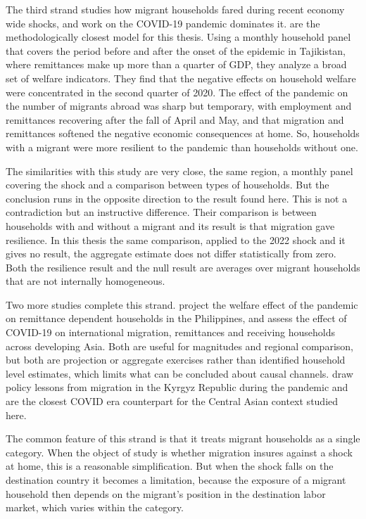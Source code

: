 The third strand studies how migrant households fared during recent economy wide shocks, and work on the COVID-19 pandemic dominates it. \cite{shimizutani2021} are the methodologically closest model for this thesis. Using a monthly household panel that covers the period before and after the onset of the epidemic in Tajikistan, where remittances make up more than a quarter of GDP, they analyze a broad set of welfare indicators. They find that the negative effects on household welfare were concentrated in the second quarter of 2020. The effect of the pandemic on the number of migrants abroad was sharp but temporary, with employment and remittances recovering after the fall of April and May, and that migration and remittances softened the negative economic consequences at home. So, households with a migrant were more resilient to the pandemic than households without one.

The similarities with this study are very close, the same region, a monthly panel covering the shock and a comparison between types of households. But the conclusion runs in the opposite direction to the result found here. This is not a contradiction but an instructive difference. Their comparison is between households with and without a migrant and its result is that migration gave resilience. In this thesis the same comparison, applied to the 2022 shock and it gives no result, the aggregate estimate does not differ statistically from zero. Both the resilience result and the null result are averages over migrant households that are not internally homogeneous.

Two more studies complete this strand. \cite{murakami2021} project the welfare effect of the pandemic on remittance dependent households in the Philippines, and \cite{kikkawa2020} assess the effect of COVID-19 on international migration, remittances and receiving households across developing Asia. Both are useful for magnitudes and regional comparison, but both are projection or aggregate exercises rather than identified household level estimates, which limits what can be concluded about causal channels. \cite{bossavie2022} draw policy lessons from migration in the Kyrgyz Republic during the pandemic and are the closest COVID era counterpart for the Central Asian context studied here.

The common feature of this strand is that it treats migrant households as a single category. When the object of study is whether migration insures against a shock at home, this is a reasonable simplification. But when the shock falls on the destination country it becomes a limitation, because the exposure of a migrant household then depends on the migrant's position in the destination labor market, which varies within the category.

